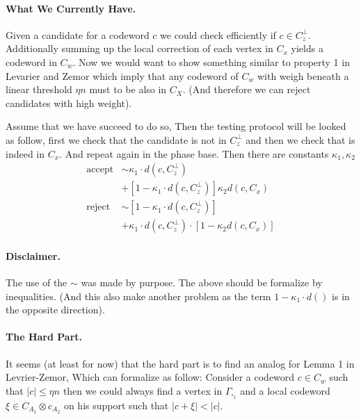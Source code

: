 \documentclass{article}
\begin{document}
\begin{multicols*}{2}
	\paragraph{What We Currently Have.} Given a candidate for a codeword $c$ we could check efficiently if $c\in C_{z}^\perp$.  
	Additionally summing up the local correction of each vertex in $C_{x}$ yields a codeword in $C_{w}$. Now we would want to show 
	something similar to property 1 in Levarier and Zemor which imply that any codeword of $C_{w}$ with weigh beneath 
	a linear threshold $\eta n $ must to be also in $C_{X}$. (And therefore we can reject candidates with high weight). 

	Assume that we have succeed to do so, Then the testing protocol will be looked as follow, 
	first we check that the candidate is not in $C_{z}^\perp$ and then we check that is indeed in $C_{x}$. And repeat again 
	in the phase base. Then there are constants $\kappa_1, \kappa_2$ 
	\begin{equation*}
	  \begin{split}
	    \text{accept} & \sim \kappa_1 \cdot  d\left( c,C_{z}^\perp \right)  \\ 
	    & +  \left[ 1 -  \kappa_1 \cdot  d\left( c,C_{z}^\perp \right)\right] \kappa_{2} d\left( c, C_{x} \right) \\
	    \text{reject} & \sim  \left[ 1 -  \kappa_1 \cdot  d\left( c,C_{z}^\perp \right)\right] \\ 
	    & +\kappa_1 \cdot  d\left( c,C_{z}^\perp \right) \cdot \left[ 1 - \kappa_{2} d\left( c, C_{x} \right) \right] 
	  \end{split}
	\end{equation*}
	\paragraph{Disclaimer.} The use of the $\sim$ was  made by purpose. The above should be formalize by inequalities. (And this also make another problem as 
	the term $ 1 - \kappa_{1} \cdot d\left(  \right) $ is in the opposite direction). 
	\paragraph{The Hard Part.} It seems (at least for now) that the hard part is to find an analog for Lemma 1 in Levrier-Zemor, Which can formalize 
	as follow: Consider a codeword $c \in C_{w}$ such that $|c| \le \eta n $ then we could always find a vertex in $\Gamma_{\square_{1}} $
	and a local codeword $\xi \in C_{A_1} \otimes c_{A_2} $ on his support such that $|c + \xi| < |c| $.     
      


\end{multicols*}
\end{document}
